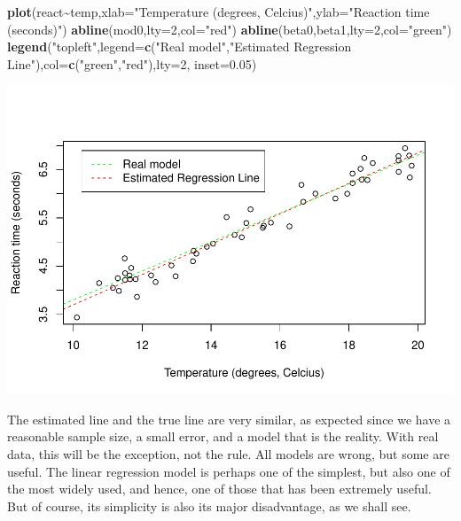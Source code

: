 \documentclass[
]{book}
\newenvironment{Shaded}{\begin{snugshade}}{\end{snugshade}}
\newcommand{\AttributeTok}[1]{\textcolor[rgb]{0.13,0.29,0.53}{#1}}
\newcommand{\DecValTok}[1]{\textcolor[rgb]{0.00,0.00,0.81}{#1}}
\newcommand{\FloatTok}[1]{\textcolor[rgb]{0.00,0.00,0.81}{#1}}
\newcommand{\FunctionTok}[1]{\textcolor[rgb]{0.13,0.29,0.53}{\textbf{#1}}}
\newcommand{\NormalTok}[1]{#1}
\newcommand{\SpecialCharTok}[1]{\textcolor[rgb]{0.81,0.36,0.00}{\textbf{#1}}}
\newcommand{\StringTok}[1]{\textcolor[rgb]{0.31,0.60,0.02}{#1}}
\begin{document}
\begin{Shaded}
\begin{Highlighting}[]
\FunctionTok{plot}\NormalTok{(react}\SpecialCharTok{\textasciitilde{}}\NormalTok{temp,}\AttributeTok{xlab=}\StringTok{"Temperature (degrees, Celcius)"}\NormalTok{,}\AttributeTok{ylab=}\StringTok{"Reaction time (seconds)"}\NormalTok{)}
\FunctionTok{abline}\NormalTok{(mod0,}\AttributeTok{lty=}\DecValTok{2}\NormalTok{,}\AttributeTok{col=}\StringTok{"red"}\NormalTok{)}
\FunctionTok{abline}\NormalTok{(beta0,beta1,}\AttributeTok{lty=}\DecValTok{2}\NormalTok{,}\AttributeTok{col=}\StringTok{"green"}\NormalTok{)}
\FunctionTok{legend}\NormalTok{(}\StringTok{"topleft"}\NormalTok{,}\AttributeTok{legend=}\FunctionTok{c}\NormalTok{(}\StringTok{"Real model"}\NormalTok{,}\StringTok{"Estimated Regression Line"}\NormalTok{),}\AttributeTok{col=}\FunctionTok{c}\NormalTok{(}\StringTok{"green"}\NormalTok{,}\StringTok{"red"}\NormalTok{),}\AttributeTok{lty=}\DecValTok{2}\NormalTok{, }\AttributeTok{inset=}\FloatTok{0.05}\NormalTok{)}
\end{Highlighting}
\end{Shaded}

\includegraphics{ECOMODbook_files/figure-latex/reg9-1.pdf}

The estimated line and the true line are very similar, as expected since we have a reasonable sample size, a small error, and a model that is the reality. With real data, this will be the exception, not the rule. All models are wrong, but some are useful. The linear regression model is perhaps one of the simplest, but also one of the most widely used, and hence, one of those that has been extremely useful. But of course, its simplicity is also its major disadvantage, as we shall see.
\end{document}
